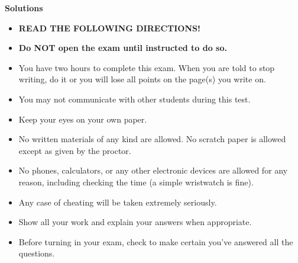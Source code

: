 \documentclass[addpoints,10pt]{exam}
\begin{document}
\ifprintanswers
\begin{center}
	\textbf{Solutions}
\end{center}
\else
\vspace*{1em}

\vspace{20pt}

\begin{itemize}
\item \textbf{READ THE FOLLOWING DIRECTIONS!}
\item \textbf{Do NOT open the exam until instructed to do so.}
\end{itemize}
\begin{itemize}
\item You have 
two hours
%
to complete this exam.  When you are told to stop writing, do it or you will lose all points on the page(s) you write on.
\item You may not communicate with other students during this test.
\item Keep your eyes on your own paper.
\item No written materials of any kind are allowed.  No scratch paper is allowed except as given by the proctor.
\item No phones, calculators, or any other electronic devices are allowed for any reason, including checking the time (a simple wristwatch is fine).
\item Any case of cheating will be taken extremely seriously.

\bigskip

\item Show all your work and explain your answers when appropriate.
\item Before turning in your exam, check to make certain you've answered all the questions.

\bigskip


\end{itemize}

\vfill

\begin{center}
\gradetable[h][questions]
\end{center}
\end{document}
